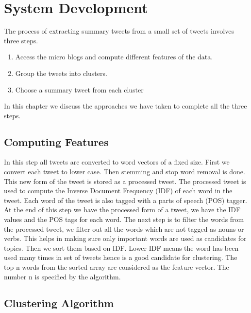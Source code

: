 \chapter{System Development}
\label{chap-four}

The process of extracting summary tweets from a small set of tweets involves three steps.

\begin{enumerate}
\item Access the micro blogs and compute different features of the data.
\item Group the tweets into clusters. 
\item Choose a summary tweet from each cluster
\end{enumerate}

In this chapter we discuss the approaches we have taken to complete all the three steps.

\section{Computing Features}

In this step all tweets are converted to word vectors of a fixed size. First we convert each tweet to lower case. Then stemming and stop word removal is done. This new form of the tweet is stored as a processed tweet. The processed tweet is used to compute the Inverse Document Frequency (IDF) of each word in the tweet. Each word of the tweet is also tagged with a parts of speech (POS) tagger. At the end of this step we have the processed form of a tweet, we have the IDF values and the POS tags for each word. The next step is to filter the words from the processed tweet, we filter out all the words which are not tagged as nouns or verbs. This helps in making sure only important words are used as candidates for topics. Then we sort them based on IDF. Lower IDF means the word has been used many times in set of tweets hence is a good candidate for clustering. The top n words from the sorted array are considered as the feature vector. The number n is specified by the algorithm. 

\section{Clustering Algorithm}

